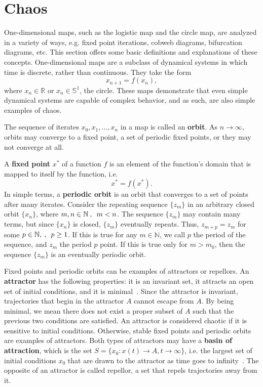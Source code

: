 \section{Chaos}
One-dimensional maps, such as the logistic map and the circle map, are
analyzed in a variety of ways, e.g. fixed point iterations,
cobweb diagrams, bifurcation diagrams, etc. This section offers some
basic definitions and explanations of these concepts. One-dimensional maps are a
subclass of dynamical systems in which time is discrete, rather than
continuous. They take the form
\begin{equation*}
x_{n+1}=f(x_n),
\end{equation*}
where $x_n \in \mathbb{R}$ or $x_n \in \mathbb{S}^1$, the circle. These maps demonstrate that even simple dynamical systems are capable
of complex behavior, and as such, are also simple examples of chaos. 

The sequence of iterates ${x_0,x_1,...,x_n}$ in a map is
called an \textbf{orbit}. As $n \to \infty$, orbits may converge to a fixed point, a
set of periodic fixed points, or they may not converge at all. 

A \textbf{fixed point} $x^*$ of a function $f$ is an element of the
function's domain that is mapped to itself by the function, i.e.
\begin{equation*}
x^* = f(x^*).
\end{equation*}
In simple terms, a \textbf{periodic orbit} is an orbit that converges to a set
of points after many iterates. Consider the repeating sequence $\{z_m\}$
in an arbitrary closed orbit $\{x_n\}$, where $m,n \in \mathbb{N} \>,
\enskip m<n$. The sequence $\{z_m\}$ may contain many terms, but since
$\{x_n\}$ is closed, $\{z_m\}$ eventually repeats. Thus, $z_{m+p}=z_m$
for some $p \in \mathbb{N}, \>, \enskip p\geq 1$. If this is true for any $m \in
\mathbb{N}$, we call $p$ the period of the sequence, and $z_m$ the
period $p$ point. If this is true only for $m > m_0$, then the
sequence $\{z_m\}$ is an
eventually periodic orbit.

Fixed points and periodic
orbits can be examples of attractors or repellors. An \textbf{attractor} has the following
properties: it is an invariant set, it attracts an open set of initial
conditions, and it is minimal~\cite{strogatz}. Since the attractor is
invariant, trajectories that begin in the attractor $A$ cannot escape
from $A$. By being minimal, we mean there does not exist a proper
subset of $A$ such that the previous two conditions are
satisfied. An attractor is considered chaotic if it is sensitive to
initial conditions. Otherwise, stable fixed points and periodic orbits are examples of attractors. Both types of attractors may have
a \textbf{basin of attraction}, which is the set $S=\{x_0:x(t) \to A, t \to \infty\}$, i.e.
the largest set of initial conditions $x_0$ that are drawn to the attractor as
time goes to infinity~\cite{strogatz}. The opposite of an attractor is
called repellor, a set that repels trajectories away from it.

